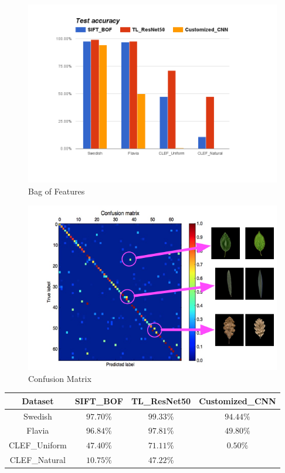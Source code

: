 \documentclass[journal, 10pt]{IEEEtran}
\begin{document}
\begin{figure}[H]
  \centering
  \includegraphics[width=1.00\linewidth]{test_accuracy_with_customized_cnn}
  \caption{ Bag of Features }
  \label{fig:test_accuracy}
\end{figure}

\begin{figure}[H]
  \centering
  \includegraphics[width=1.00\linewidth]{best_cm_uniform}
  \caption{ Confusion Matrix }
  \label{fig:best_cm_uniform}
\end{figure}

\begin{tabular}{c@{}c@{}c@{}c@{}}
Dataset       & SIFT\_BOF & TL\_ResNet50  & Customized\_CNN \\
\hline
Swedish       & $97.70\%$ & $99.33\%$     & $94.44\%$ \\
Flavia        & $96.84\%$ & $97.81\%$     & $49.80\%$ \\
CLEF\_Uniform & $47.40\%$ & $71.11\%$     & $0.50\%$  \\
CLEF\_Natural & $10.75\%$ & $47.22\%$     &
\end{tabular}
\end{document}
